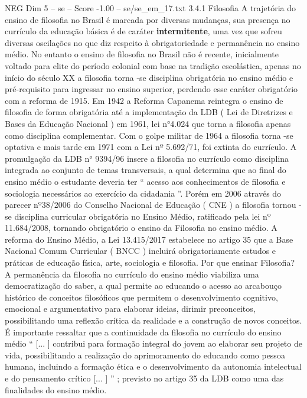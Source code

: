 \begin{textsample}{NEG Dim 5 – se – Score -1.00 – se/se\_em\_17.txt}  \label{ex:f5_neg_154}
3.4.1 Filosofia A trajetória do ensino de filosofia no Brasil é marcada por diversas mudanças, sua presença no currículo da educação básica é de caráter \textbf{intermitente}, uma vez que sofreu diversas oscilações no que diz respeito à obrigatoriedade e permanência no ensino médio.
No entanto o ensino de filosofia no Brasil não é recente, inicialmente voltado para elite do período colonial com base na tradição escolástica, apenas no início do século XX a filosofia torna -se disciplina obrigatória no ensino médio e pré-requisito para ingressar no ensino superior, perdendo esse caráter obrigatório com a reforma de 1915.
Em 1942 a Reforma Capanema reintegra o ensino de filosofia de forma obrigatória até a implementação da LDB ( Lei de Diretrizes e Bases da Educação Nacional ) em 1961, lei n{\EmojiFont °}4.024 que torna a filosofia apenas como disciplina complementar.
Com o golpe militar de 1964 a filosofia torna -se optativa e mais tarde em 1971 com a Lei nº 5.692/71, foi extinta do currículo.
A promulgação da LDB n{\EmojiFont °} 9394/96 insere a filosofia no currículo como disciplina integrada ao conjunto de temas transversais, a qual determina que ao final do ensino médio o estudante deveria ter “ acesso aos conhecimentos de filosofia e sociologia necessários ao exercício da cidadania ”.
Porém em 2006 através do parecer nº38/2006 do Conselho Nacional de Educação ( CNE ) a filosofia tornou -se disciplina curricular obrigatória no Ensino Médio, ratificado pela lei nº 11.684/2008, tornando obrigatório o ensino da Filosofia no ensino médio.
A reforma do Ensino Médio, a Lei 13.415/2017 estabelece no artigo 35 que a Base Nacional Comum Curricular ( BNCC ) incluirá obrigatoriamente estudos e práticas de educação física, arte, sociologia e filosofia.
Por que ensinar Filosofia?
A permanência da filosofia no currículo do ensino médio viabiliza uma democratização do saber, a qual permite ao educando o acesso ao arcabouço histórico de conceitos filosóficos que permitem o desenvolvimento cognitivo, emocional e argumentativo para elaborar ideias, dirimir preconceitos, possibilitando uma reflexão crítica da realidade e a construção de novos conceitos.
É importante ressaltar que a continuidade da filosofia no currículo do ensino médio “ [... ] contribui para formação integral do jovem ao elaborar seu projeto de vida, possibilitando a realização do aprimoramento do educando como pessoa humana, incluindo a formação ética e o desenvolvimento da autonomia intelectual e do pensamento crítico [... ] ” ; previsto no artigo 35 da LDB como uma das finalidades do ensino médio.

\end{textsample}
